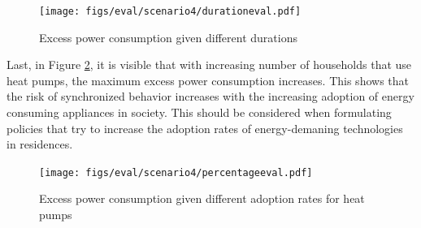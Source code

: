 \begin{figure}[!ht]
    \center
    \texttt{[image: figs/eval/scenario4/durationeval.pdf]}
    \caption{Excess power consumption given different durations}
    \label{warningmessagedifferentdurations}
\end{figure}

Last, in Figure \ref{warningmessagedifferentadoptionrates},
it is visible that with increasing number of households 
that use heat pumps, the maximum excess power consumption
increases. This shows that the risk of synchronized 
behavior increases with the increasing adoption of 
energy consuming appliances in society. This should 
be considered when formulating policies that try to 
increase the adoption rates of energy-demaning 
technologies in residences.

\begin{figure}[!ht]
    \center
    \texttt{[image: figs/eval/scenario4/percentageeval.pdf]}
    \caption{Excess power consumption given different adoption 
    rates for heat pumps}
    \label{warningmessagedifferentadoptionrates}
\end{figure}

